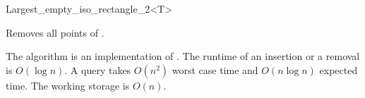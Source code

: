 \begin{ccRefClass}{Largest_empty_iso_rectangle_2<T>}


{Removes all points of \ccVar.}


\ccImplementation

The algorithm is an implementation of \cite{o-naler-90}. The runtime of an
insertion or a removal is $O(\log n)$. A query takes $O(n^2)$ worst
case time and $O(n \log n)$ expected time. The working storage is $
O(n)$.












\end{ccRefClass}


